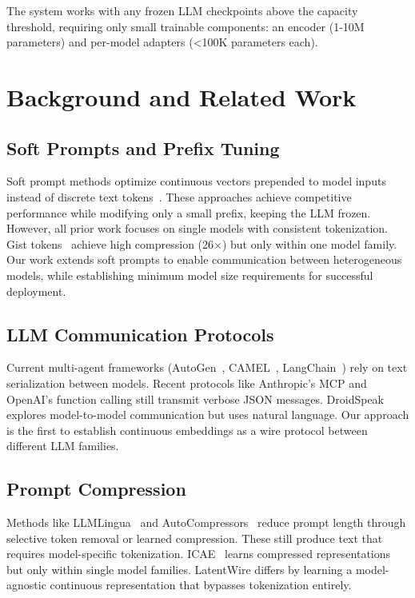 \documentclass{article}
\begin{document}
The system works with any frozen LLM checkpoints above the capacity threshold, requiring only small trainable components: an encoder (1-10M parameters) and per-model adapters (<100K parameters each).

\section{Background and Related Work}

\subsection{Soft Prompts and Prefix Tuning}

Soft prompt methods optimize continuous vectors prepended to model inputs instead of discrete text tokens~\cite{lester2021prompt,li2021prefix,liu2021ptuning}. These approaches achieve competitive performance while modifying only a small prefix, keeping the LLM frozen. However, all prior work focuses on single models with consistent tokenization. Gist tokens~\cite{mu2023gist} achieve high compression (26$\times$) but only within one model family. Our work extends soft prompts to enable communication between heterogeneous models, while establishing minimum model size requirements for successful deployment.

\subsection{LLM Communication Protocols}

Current multi-agent frameworks (AutoGen~\cite{autogen}, CAMEL~\cite{camel}, LangChain~\cite{langchain2024multiagent}) rely on text serialization between models. Recent protocols like Anthropic's MCP and OpenAI's function calling still transmit verbose JSON messages. DroidSpeak~\cite{droidspeak2024} explores model-to-model communication but uses natural language. Our approach is the first to establish continuous embeddings as a wire protocol between different LLM families.

\subsection{Prompt Compression}

Methods like LLMLingua~\cite{llmlingua2024} and AutoCompressors~\cite{chevalier2023autocompressors} reduce prompt length through selective token removal or learned compression. These still produce text that requires model-specific tokenization. ICAE~\cite{ge2024icae} learns compressed representations but only within single model families. LatentWire differs by learning a model-agnostic continuous representation that bypasses tokenization entirely.
\end{document}
